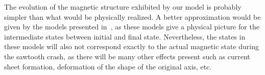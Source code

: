 \documentclass[%
superscriptaddress,
amsmath,amssymb,
aps,
pre,
floatfix,
]{revtex4-2}
\begin{document}
The evolution of the magnetic structure exhibited by our model is probably simpler than what would be physically realized. 
A better approximation would be given by the models presented in~\cite{kolesnichenko1996theory, jaulmes2014redistribution}, as these models give a physical picture for the intermediate states between initial and final state. 
Nevertheless, the states in these models will also not correspond exactly to the actual magnetic state during the sawtooth crash, as there will be many other effects present such as current sheet formation, deformation of the shape of the original axis, etc.




\end{document}
